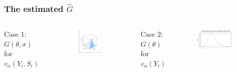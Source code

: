 \documentclass[10pt,mathserif,aspectratio=169]{beamer}
\begin{document}
\begin{frame}
  \frametitle{The estimated $\hat{G}$}
  \begin{columns}[T,onlytextwidth]
    Case 1: $G(\theta,\sigma)$ for $v_\alpha(Y_i,S_i)$
    \begin{figure}
      \centering
      \includegraphics[width=\textwidth]{../../Figures/2013-2022/GMM_m/GLVmix_s.pdf}
    \end{figure}

    Case 2: $G(\theta)$ for $v_\alpha(Y_i)$
    \begin{figure}
      \centering
      \includegraphics[width=0.9\textwidth]{../../Figures/2013-2022/GMM_m/GLmix_s.pdf}
    \end{figure}
  \end{columns}
\end{frame}
\end{document}
